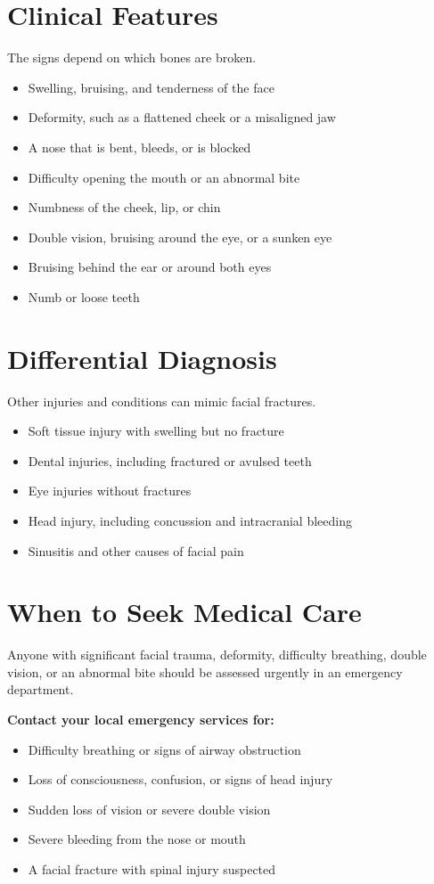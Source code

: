 \section*{Clinical Features}
The signs depend on which bones are broken.
\begin{itemize}
    \item Swelling, bruising, and tenderness of the face
    \item Deformity, such as a flattened cheek or a misaligned jaw
    \item A nose that is bent, bleeds, or is blocked
    \item Difficulty opening the mouth or an abnormal bite
    \item Numbness of the cheek, lip, or chin
    \item Double vision, bruising around the eye, or a sunken eye
    \item Bruising behind the ear or around both eyes
    \item Numb or loose teeth
\end{itemize}

\section*{Differential Diagnosis}
Other injuries and conditions can mimic facial fractures.
\begin{itemize}
    \item Soft tissue injury with swelling but no fracture
    \item Dental injuries, including fractured or avulsed teeth
    \item Eye injuries without fractures
    \item Head injury, including concussion and intracranial bleeding
    \item Sinusitis and other causes of facial pain
\end{itemize}

\section*{When to Seek Medical Care}
Anyone with significant facial trauma, deformity, difficulty breathing, double vision, or an abnormal bite should be assessed urgently in an emergency department.

\textbf{Contact your local emergency services for:}
\begin{itemize}
    \item Difficulty breathing or signs of airway obstruction
    \item Loss of consciousness, confusion, or signs of head injury
    \item Sudden loss of vision or severe double vision
    \item Severe bleeding from the nose or mouth
    \item A facial fracture with spinal injury suspected
\end{itemize}

